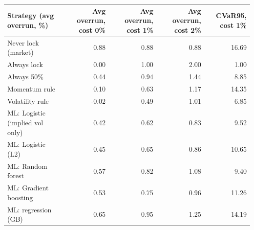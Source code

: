 \begin{tabular}{lrrrr}
\toprule
Strategy (avg overrun, \%) & Avg overrun, cost 0\% & Avg overrun, cost 1\% & Avg overrun, cost 2\% & CVaR95, cost 1\% \\
\midrule
Never lock (market) & 0.88 & 0.88 & 0.88 & 16.69 \\
Always lock & 0.00 & 1.00 & 2.00 & 1.00 \\
Always 50\% & 0.44 & 0.94 & 1.44 & 8.85 \\
Momentum rule & 0.10 & 0.63 & 1.17 & 14.35 \\
Volatility rule & -0.02 & 0.49 & 1.01 & 6.85 \\
ML: Logistic (implied vol only) & 0.42 & 0.62 & 0.83 & 9.52 \\
ML: Logistic (L2) & 0.45 & 0.65 & 0.86 & 10.65 \\
ML: Random forest & 0.57 & 0.82 & 1.08 & 9.40 \\
ML: Gradient boosting & 0.53 & 0.75 & 0.96 & 11.26 \\
ML: regression (GB) & 0.65 & 0.95 & 1.25 & 14.19 \\
\bottomrule
\end{tabular}
